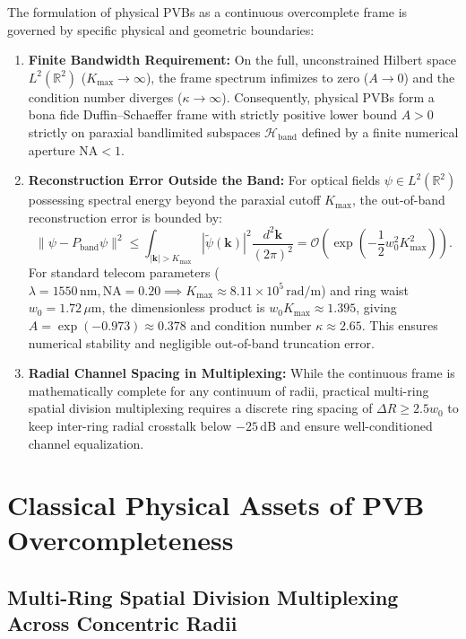 \documentclass{optica-article}
\begin{document}
The formulation of physical PVBs as a continuous overcomplete frame is governed by specific physical and geometric boundaries:
\begin{enumerate}
    \item \textbf{Finite Bandwidth Requirement:} On the full, unconstrained Hilbert space $L^2(\mathbb{R}^2)$ ($K_{\max} \to \infty$), the frame spectrum infimizes to zero ($A \to 0$) and the condition number diverges ($\kappa \to \infty$). Consequently, physical PVBs form a bona fide Duffin--Schaeffer frame with strictly positive lower bound $A > 0$ strictly on paraxial bandlimited subspaces $\mathcal{H}_{\text{band}}$ defined by a finite numerical aperture $\text{NA} < 1$.
    \item \textbf{Reconstruction Error Outside the Band:} For optical fields $\psi \in L^2(\mathbb{R}^2)$ possessing spectral energy beyond the paraxial cutoff $K_{\max}$, the out-of-band reconstruction error is bounded by:
    \begin{equation}
    \|\psi - P_{\text{band}} \psi\|^2 \le \int_{|\mathbf{k}| > K_{\max}} |\widetilde{\psi}(\mathbf{k})|^2 \frac{d^2\mathbf{k}}{(2\pi)^2} = \mathcal{O}\left( \exp\left( - \frac{1}{2} w_0^2 K_{\max}^2 \right) \right).
    \label{eq:out_of_band_error}
    \end{equation}
    For standard telecom parameters ($\lambda = 1550\,\text{nm}, \text{NA} = 0.20 \implies K_{\max} \approx 8.11 \times 10^5\,\text{rad/m}$) and ring waist $w_0 = 1.72\,\mu\text{m}$, the dimensionless product is $w_0 K_{\max} \approx 1.395$, giving $A = \exp(-0.973) \approx 0.378$ and condition number $\kappa \approx 2.65$. This ensures numerical stability and negligible out-of-band truncation error.
    \item \textbf{Radial Channel Spacing in Multiplexing:} While the continuous frame is mathematically complete for any continuum of radii, practical multi-ring spatial division multiplexing requires a discrete ring spacing of $\Delta R \ge 2.5 w_0$ to keep inter-ring radial crosstalk below $-25\,\text{dB}$ and ensure well-conditioned channel equalization.
\end{enumerate}

\section{Classical Physical Assets of PVB Overcompleteness}
\label{sec:classical_assets}

\subsection{Multi-Ring Spatial Division Multiplexing Across Concentric Radii}
\end{document}
